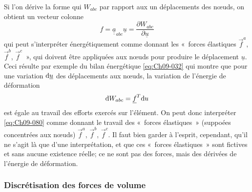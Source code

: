 Si l'on dérive la forme qui  $W_{abc}$ par rapport aux 
un déplacements des nœuds, on obtient un vecteur colonne
\begin{equation}
    f = \underline{\underline{a}}_{abc} \underline{u} = \frac{\partial W_{abc}}{\partial \underline{u}}
    \label{eq:Ch09-079}
\end{equation}
qui peut s'interpréter énergétiquement comme donnant les «~forces élastiques $\vec{f}^a$, $\vec{f}^b$, $\vec{f}^c$~», qui doivent être appliquées aux nœuds pour produire le déplacement $\underline{u}$.
Ceci résulte par exemple du bilan énergétique \eqref{eq:Ch09-032} qui montre que pour une variation $\mathrm{d} \underline{u}$ des déplacements aux nœuds, la variation de l'énergie de déformation 
\begin{equation}
    \mathrm{d} W_{abc} = \underline{f}^T \mathrm{d} u
    \label{eq:Ch09-080}
\end{equation}
est égale au travail des efforts exercés sur l'élément.
On peut donc interpréter \eqref{eq:Ch09-080} comme donnant le travail des «~forces élastiques~» (suppoées concentrées aux nœuds) $\vec{f}^a$, $\vec{f}^b$, $\vec{f}^c$.
Il faut bien garder à l'esprit, cependant, qu'il ne s'agit là que d'une interprétation, et que ces «~forces élastiques~» sont fictives et sans aucune existence réelle; ce ne sont pas 
des forces, mais des dérivées de l'énergie de déformation. 

\subsubsection{Discrétisation des forces de volume}
\endinput
Calculons la contribution du triangle abc au travail des forces de volume, càd dans \eqref{eq:Ch09-070} des forces de pesanteur. En reportant \eqref{eq:Ch09-073} dans 
\eqref{eq:Ch09-070} et en remarquant que 
(81 ) 
on obtiendra 
\eqref{eq:Ch09-082} _ _  (.u: + 4;+"'< ) = 
) 
(83 ) 1 - 1 -P'à'S 1 3 ~ 
D'un point de vue énergétique, on peut interpréter \eqref{eq:Ch09-082} en disant que les 
---1'0.. -"'t--">
forces de volume sont équivalentes aux trois forces concentrées 'f ,tt' ,~,c.. appliquées aux nœuds. 
De manière générale, l'écriture du travail des efforts de volume conduit à décomposer ces efforts en trois forces concentrées appliquées aux nœuds. 
-152 ­c) Discrétisation des efforts surfaciques 
Soit ac un côté du triangle abc appartenant à 

les efforts surfaciques sont donnés 
X't -t----------', :r., 

b
b
" 
La restriction de \eqref{eq:Ch09-075} à ac donne, dans le cas particulier du barrage (ac vertical) 

